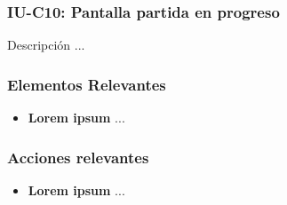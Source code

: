 
\subsubsection{IU-C10: Pantalla partida en progreso}

 Descripción ...


\subsubsection{Elementos Relevantes}

    \begin{itemize}
    \item {\bf Lorem ipsum}
        ...
    \end{itemize}

\subsubsection{Acciones relevantes}

    \begin{itemize}
    \item {\bf Lorem ipsum}
        ...
    \end{itemize}

\clearpage
